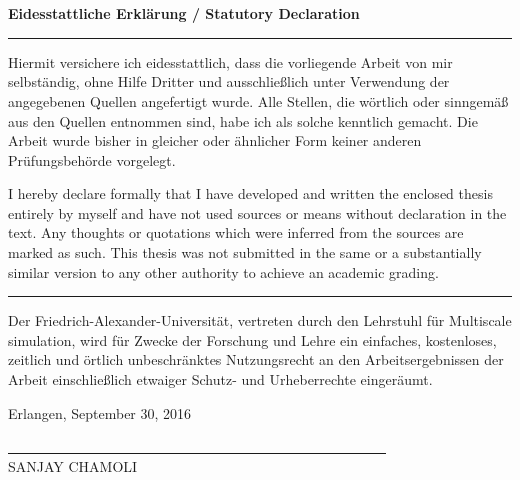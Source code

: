 %
%


\chapter*{\ }


\vspace*{\fill}


\begin{Large}
	\textbf{Eidesstattliche Erklärung / Statutory Declaration}
\end{Large}
\vspace{1.5em}


\noindent\hrule

Hiermit versichere ich eidesstattlich, dass die vorliegende Arbeit von mir
selbständig, ohne Hilfe Dritter und ausschließlich unter Verwendung der
angegebenen Quellen angefertigt wurde. Alle Stellen, die wörtlich oder
sinngemäß aus den Quellen entnommen sind, habe ich als solche kennt\-lich
gemacht. Die Arbeit wurde bisher in gleicher oder ähnlicher Form keiner anderen
Prüfungsbehörde vorgelegt. 
\vspace{1.5em}


I hereby declare formally that I have developed and written the enclosed thesis
entirely by myself and have not used sources or means without declaration in
the text. Any thoughts or quotations which were inferred from the sources are
marked as such. This thesis was not submitted in the same or a substantially
similar version to any other authority to achieve an academic grading. 

\noindent\hrule

\vspace{2em}


Der Friedrich-Alexander-Universität, vertreten durch den Lehrstuhl
für Multiscale simulation, wird für Zwecke der Forschung und Lehre ein
einfaches, kostenloses, zeitlich und örtlich unbeschränktes
Nutzungsrecht an den Arbeitsergebnissen der Arbeit einschließlich
etwaiger Schutz- und Urheberrechte eingeräumt.


\vspace{2em}

Erlangen, September 30, 2016
\begin{flushright}
	\underline{\ \ \ \ \ \ \ \ \ \ \ \ \ \ \ \ \ \ \ \ \ \ \ \ \ 
		\ \ \ \ \ \ \ \ \ \ \ \ \ \ \ \ \ \ \ \ \ \ \ \ \ \ \ \ \ 
	} \\
	\small{SANJAY CHAMOLI}
\end{flushright}
